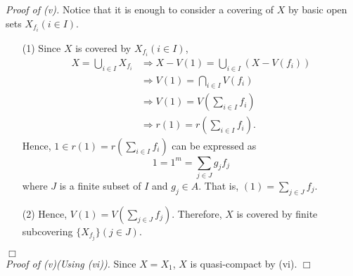 \documentclass{article}
\begin{document}
\emph{Proof of (v).}
Notice that it is enough to consider a covering of $X$
by basic open sets $X_{f_i} (i \in I)$.
\begin{enumerate}
\item[(1)]
Since $X$ is covered by $X_{f_i} (i \in I)$,
\begin{align*}
X = \bigcup_{i \in I} X_{f_i}
&\Longrightarrow X - V(1) = \bigcup_{i \in I} (X - V(f_i)) \\
&\Longrightarrow V(1) = \bigcap_{i \in I} V(f_i) \\
&\Longrightarrow V(1) = V\left( \sum_{i \in I} f_i \right) \\
&\Longrightarrow r(1) = r\left( \sum_{i \in I} f_i \right).
\end{align*}
Hence, $1 \in r(1) = r\left( \sum_{i \in I} f_i \right)$ can be expressed as
$$1 = 1^m = \sum_{j \in J} g_j f_j$$
where $J$ is a finite subset of $I$ and $g_j \in A$.
That is, $(1) = \sum_{j \in J} f_j$.
\item[(2)]
Hence, $V(1) = V\left( \sum_{j \in J} f_j \right)$.
Therefore, $X$ is covered by finite subcovering $\{X_{f_j}\} (j \in J)$.
\end{enumerate}
$\Box$ \\



\emph{Proof of (v)(Using (vi)).}
Since $X = X_1$, $X$ is quasi-compact by (vi).
$\Box$ \\
\end{document}
